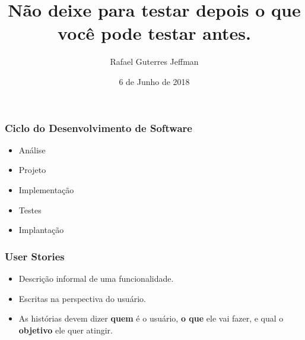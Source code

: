 


\usepackage{setspace}

\title{Não deixe para testar depois o que você pode testar antes.}
\author{Rafael Guterres Jeffman}
\date{6 de Junho de 2018}

\newcommand\bddfeature[2]{{\color{red}Feature: }{#1\\}{\hspace{1cm}#2\\}}
\newcommand\bddscenario[1]{{\color{blue!75!black}Scenario: }{#1\\}}
\newcommand\bddgiven[1]{{\color{green!50!black}Given }{#1\\}}
\newcommand\bddwhen[1]{{\color{green!50!black}When }{#1\\}}
\newcommand\bddthen[1]{{\color{green!50!black}Then }{#1\\}}
\newcommand\bddand[1]{{\color{green!50!black}And }{#1\\}}
\newcommand\bddbut[1]{{\color{green!50!black}But }{#1\\}}

\makeatletter
\preto{\@verbatim}{\topsep=0pt \partopsep=0pt}
\makeatother



\coverframe





\begin{frame}
    \frametitle{Ciclo do Desenvolvimento de Software}
    \begin{itemize}
        \item Análise
        \item Projeto
        \item Implementação
        \item Testes
        \item Implantação
    \end{itemize}
\end{frame}

\begin{frame}
    \frametitle{User Stories}
    \begin{itemize}
        \item Descrição informal de uma funcionalidade.
        \item Escritas na perspectiva do usuário.
        \item As histórias devem dizer \textbf{quem} é o usuário,
        \textbf{o que} ele vai fazer, e qual o \textbf{objetivo}
        ele quer atingir.
    \end{itemize}
\end{frame}

